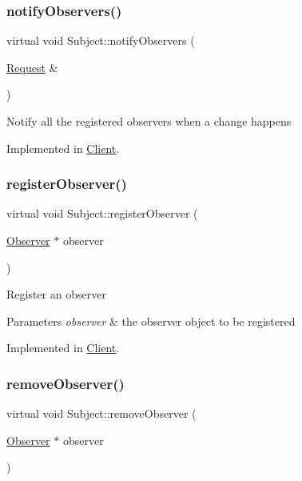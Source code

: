 \subsubsection{\texorpdfstring{notify\+Observers()}{notifyObservers()}}
{\footnotesize\ttfamily virtual void Subject\+::notify\+Observers (\begin{DoxyParamCaption}\item[{\hyperlink{classRequest}{Request} \&}]{ }\end{DoxyParamCaption})\hspace{0.3cm}{\ttfamily [pure virtual]}}

Notify all the registered observers when a change happens 

Implemented in \hyperlink{classClient_a2fb08fe51afa68997faa22474e114771}{Client}.

\mbox{\label{classSubject_ae3f8d320b19b7d0fe695a3b4e7660002}} 
\subsubsection{\texorpdfstring{register\+Observer()}{registerObserver()}}
{\footnotesize\ttfamily virtual void Subject\+::register\+Observer (\begin{DoxyParamCaption}\item[{\hyperlink{classObserver}{Observer} $\ast$}]{observer }\end{DoxyParamCaption})\hspace{0.3cm}{\ttfamily [pure virtual]}}

Register an observer 
\begin{DoxyParams}{Parameters}
{\em observer} & the observer object to be registered \\
\hline
\end{DoxyParams}


Implemented in \hyperlink{classClient_a1426f0582287f6c583d8681e540059ab}{Client}.

\mbox{\label{classSubject_a86699df0364a9091d1887f344255e9ff}} 
\subsubsection{\texorpdfstring{remove\+Observer()}{removeObserver()}}
{\footnotesize\ttfamily virtual void Subject\+::remove\+Observer (\begin{DoxyParamCaption}\item[{\hyperlink{classObserver}{Observer} $\ast$}]{observer }\end{DoxyParamCaption})\hspace{0.3cm}{\ttfamily [pure virtual]}}

